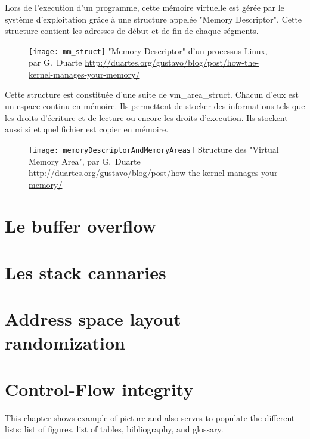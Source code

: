 Lors de l'execution d'un programme, cette mémoire virtuelle est gérée par le système d'exploitation grâce à une structure appelée "Memory Descriptor". Cette structure contient les adresses de début et de fin de chaque ségments.

\begin{figure}[H]
	\centering
	\texttt{[image: mm\_struct]}
	{"Memory Descriptor" d'un processus Linux, par G.~Duarte}
	{\url{http://duartes.org/gustavo/blog/post/how-the-kernel-manages-your-memory/}}
	\label{fig:mm_struct}
\end{figure}

Cette structure est constituée d'une suite de vm\_area\_struct. Chacun d'eux est un espace continu en mémoire. Ils permettent de stocker des informations tels que les droits d'écriture et de lecture ou encore les droits d'execution. Ils stockent aussi si et quel fichier est copier en mémoire.

\begin{figure}[H]
	\centering
	\texttt{[image: memoryDescriptorAndMemoryAreas]}
	{Structure des "Virtual Memory Area", par G.~Duarte}
	{\url{http://duartes.org/gustavo/blog/post/how-the-kernel-manages-your-memory/}}
	\label{fig:memoryDescriptorAndMemoryAreas}
\end{figure}


\section{Le buffer overflow}


\section{Les stack cannaries}


\section{Address space layout randomization}


\section{Control-Flow integrity}



\newpage

This chapter shows example of picture and also serves to populate the different lists: list of figures, list of tables, bibliography, and glossary.

